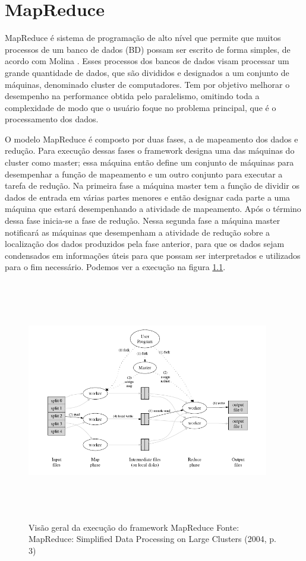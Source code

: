 \chapter{\textbf{MapReduce}}

MapReduce é sistema de programação de alto nível que permite que muitos processos de um 
banco de dados (BD) possam ser escrito de forma simples, de acordo com Molina \cite{Molina}.
Esses processos dos bancos de dados visam processar um grande quantidade de dados, que
são divididos e designados a um conjunto de máquinas, denominado
cluster de computadores. Tem por objetivo melhorar o desempenho na performance
obtida pelo paralelismo, omitindo toda a complexidade de modo que o usuário
foque no problema principal, que é o processamento dos dados.

O modelo MapReduce é composto por duas fases, a de mapeamento dos dados e
redução. Para execução dessas fases o framework designa uma das
máquinas do cluster como master; essa máquina então define um conjunto de
máquinas para desempenhar a função de mapeamento e um outro conjunto para
executar a tarefa de redução. Na primeira fase a máquina master tem a função de
dividir os dados de entrada em várias partes menores e então designar cada parte
a uma máquina que estará desempenhando a atividade de mapeamento. Após o término
dessa fase inicia-se a fase de redução. Nessa segunda fase a máquina master
notificará as máquinas que desempenham a atividade de redução sobre a
localização dos dados produzidos pela fase anterior, para que os dados sejam
condensados em informações úteis para que possam ser interpretados e utilizados
para o fim necessário. Podemos ver a execução na figura \ref{MapReduce}.

\begin{figure}[ht]
  \centering
  \includegraphics[width=400px,height=400px]{img/mapreduce.png}
  \caption{Visão geral da execução do framework MapReduce\newline
  Fonte: MapReduce: Simplified Data Processing on Large Clusters (2004, p. 3)}
  \label{MapReduce}
\end{figure}

